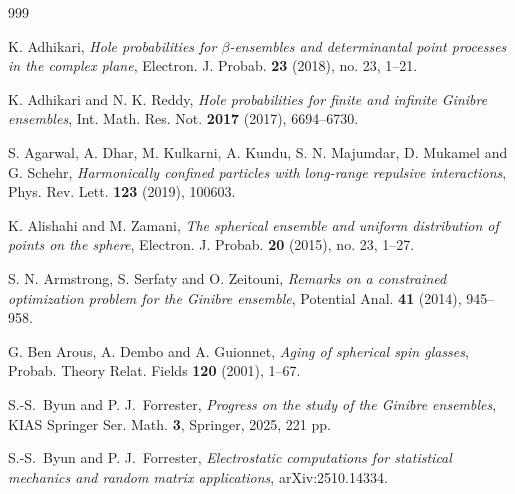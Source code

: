 \documentclass{amsart}
\theoremstyle{plain}
\theoremstyle{remark}
\numberwithin{equation}{section}
\begin{document}
 



























% 
% 


\begin{thebibliography}{999}

 K. Adhikari, \emph{Hole probabilities for $\beta$-ensembles and determinantal point processes in the complex plane}, Electron. J. Probab. \textbf{23} (2018), no. 23, 1--21.


 K. Adhikari and N. K. Reddy, \emph{Hole probabilities for finite and infinite Ginibre ensembles}, Int. Math. Res. Not. \textbf{2017} (2017), 6694--6730.

 S. Agarwal, A. Dhar, M. Kulkarni, A. Kundu, S. N. Majumdar, D. Mukamel and G. Schehr, \emph{Harmonically confined particles with long-range repulsive interactions}, Phys. Rev. Lett. \textbf{123} (2019), 100603.%


 K. Alishahi and M. Zamani, \emph{The spherical ensemble and uniform distribution of points on the sphere}, Electron. J. Probab. \textbf{20} (2015), no. 23, 1--27.

 S. N. Armstrong, S. Serfaty and O. Zeitouni, \emph{Remarks on a constrained optimization problem for the Ginibre ensemble}, Potential Anal. \textbf{41} (2014), 945--958.



 G. Ben Arous, A. Dembo and A. Guionnet, \emph{Aging of spherical spin glasses}, Probab. Theory Relat. Fields \textbf{120} (2001), 1--67. 


 S.-S.~Byun and P. J.~Forrester, \emph{Progress on the study of the Ginibre ensembles}, KIAS Springer Ser. Math. \textbf{3}, Springer, 2025, 221 pp. 

 S.-S.~Byun and P. J.~Forrester, \emph{Electrostatic computations for statistical mechanics and random matrix applications}, arXiv:2510.14334.


\end{thebibliography}
\end{document}
